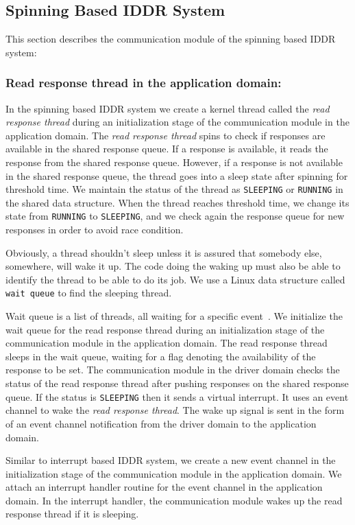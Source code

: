 \subsection{Spinning Based IDDR System}
This section describes the communication module of the spinning based IDDR system:

\subsubsection*{Read response thread in the application domain:} 
In the spinning based IDDR system we create a kernel thread called the \textit{read
response thread} during an initialization stage of the communication
module in the application domain. The \textit{read response thread} spins
to check if responses are available in the shared response queue. If a
response is available, it reads the response from the shared response
queue. However, if a response is not available in the shared response
queue, the thread goes into a sleep state after spinning for threshold time. We
maintain the status of the thread as \texttt{SLEEPING} or \texttt{RUNNING}
in the shared data structure. When the thread reaches threshold time, we change
its state from \texttt{RUNNING} to \texttt{SLEEPING}, and we check again the
response queue for new responses in order to avoid race condition. 

Obviously, a thread shouldn't sleep unless it is assured that somebody else, 
somewhere, will wake it up. The code doing the waking up must also be able to 
identify the thread to be able to do its job. We use a Linux data structure called 
\texttt{wait queue} to find the sleeping thread. 

Wait queue is a list of threads, all waiting for a specific event~\cite{Galvin, Bovet:2005:ULK:1077084}. 
We initialize the wait queue for the read response thread during an initialization stage 
of the communication module in the application domain. The read response thread sleeps 
in the wait queue, waiting for a flag denoting the availability of the response to be set. 
The communication module in the driver domain checks the status of the read response 
thread after pushing responses on the shared response queue. If the status is 
\texttt{SLEEPING} then it sends a virtual interrupt. It uses an event channel to wake the \textit{read
response thread}. The wake up signal is sent in the form of an event channel notification from the driver
domain to the application domain. 

Similar to interrupt based IDDR system, we create a new event channel in
the initialization stage of the communication module in the application
domain. We attach an interrupt handler routine for the event channel
in the application domain. In the interrupt handler, the communication
module wakes up the read response thread if it is sleeping.

